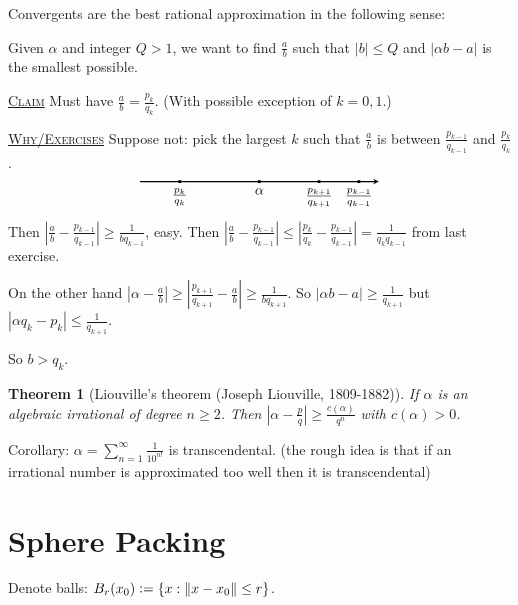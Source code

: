 \documentclass{report}
\newcommand{\norm}[1]{\left\| #1 \right\|}
\newcommand{\set}[1]{\left\{ #1 \right\}}
\newcommand{\abs}[1]{\left| #1 \right|}
\newcommand{\defeq}{\vcentcolon=}
\newcommand{\fancyem}[1]{\underline{\textsc{#1}}}
\newtheorem{theorem}{Theorem}[section]
\theoremstyle{definition}
\theoremstyle{remark}
\numberwithin{equation}{section}
\begin{document}
Convergents are the best rational approximation in the following sense:

Given $\alpha$ and integer $Q > 1$, we want to find $\frac{a}{b}$ such that $|b| \leq Q$ and $|\alpha b - a|$ is the smallest possible.

\fancyem{Claim} Must have $\frac{a}{b} = \frac{p_k}{q_k}$. (With possible exception of $k = 0, 1$.)

\fancyem{Why/Exercises} Suppose not: pick the largest $k$ such that $\frac{a}{b}$ is between $\frac{p_{k-1}}{q_{k-1}}$ and $\frac{p_k}{q_k}$.
\[\begin{tikzpicture}
    \draw[thick, -stealth](-3,0) -> (xyz cs:x=3);
    \node[shape=rectangle, fill=black, scale = 0.3] (A) at (0, 0) {};
        \node[below] at (A.south) {$\alpha$};
    \node[shape=rectangle, fill=black, scale = 0.3] (A2) at (-2, 0) {};
        \node[below] at (A2.south) {$\frac{p_k}{q_k}$};
    \node[shape=rectangle, fill=black, scale = 0.3] (A3) at (2.5, 0) {};
        \node[below] at (A3.south) {$\frac{p_{k-1}}{q_{k-1}}$};
    \node[shape=rectangle, fill=black, scale = 0.3] (A4) at (1.5, 0) {};
        \node[below] at (A4.south) {$\frac{p_{k+1}}{q_{k+1}}$};
\end{tikzpicture}\]
Then $\left|\frac{a}{b}-\frac{p_{k-1}}{q_{k-1}}\right| \geq \frac{1}{bq_{k-1}}$, easy.
Then $\abs{\frac{a}{b} - \frac{p_{k-1}}{q_{k-1}}} \leq \abs{\frac{p_k}{q_k}-\frac{p_{k-1}}{q_{k-1}}} = \frac{1}{q_kq_{k-1}}$ from last exercise. 

On the other hand $\abs{\alpha - \frac{a}{b}}\geq\abs{\frac{p_{k+1}}{q_{k+1}}-\frac{a}{b}} \geq \frac{1}{bq_{k+1}}$. So $\abs{\alpha b - a} \geq \frac{1}{q_{k+1}}$ but $\abs{\alpha q_k - p_k}\leq\frac{1}{q_{k+1}}$. 

So $b > q_k$.

\begin{theorem}[Liouville's theorem (Joseph Liouville, 1809-1882)]
    If $\alpha$ is an algebraic irrational of degree $n \geq 2$. Then $\abs{\alpha - \frac{p}{q}} \geq \frac{c(\alpha)}{q^n}$ with $c(\alpha) > 0$.
\end{theorem}
Corollary: $\alpha = \sum_{n=1}^\infty \frac{1}{10^{n!}}$ is transcendental. (the rough idea is that if an irrational number is approximated too well then it is transcendental)


\section{Sphere Packing}
Denote balls: $B_r(x_0) \defeq \set{x: \norm{x - x_0} \leq r}$.
\end{document}
